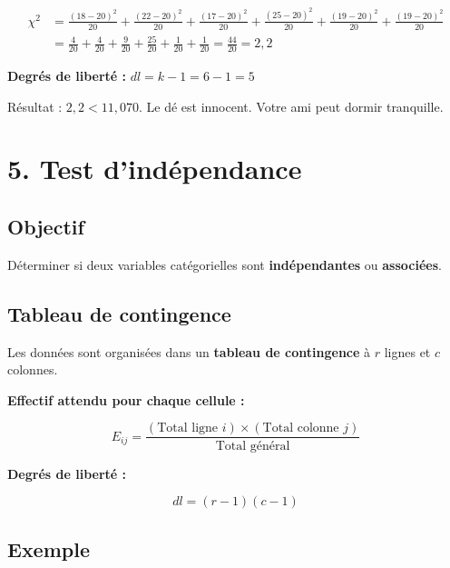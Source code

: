 \documentclass[12pt, a4paper]{article}
\begin{document}
\begin{align*}
  \chi^2 &= \frac{(18-20)^2}{20} + \frac{(22-20)^2}{20} + \frac{(17-20)^2}{20}
            + \frac{(25-20)^2}{20} + \frac{(19-20)^2}{20} + \frac{(19-20)^2}{20} \\
         &= \frac{4}{20} + \frac{4}{20} + \frac{9}{20} + \frac{25}{20}
            + \frac{1}{20} + \frac{1}{20}
          = \frac{44}{20} = 2{,}2
\end{align*}

\textbf{Degrés de liberté :} $dl = k - 1 = 6 - 1 = 5$

\begin{humourbox}
Résultat : $2{,}2 < 11{,}070$. Le dé est innocent. Votre ami peut dormir tranquille.
\end{humourbox}

\section{5. Test d'indépendance}

\subsection{Objectif}

Déterminer si deux variables catégorielles sont \textbf{indépendantes} ou
\textbf{associées}.

\subsection{Tableau de contingence}

Les données sont organisées dans un \textbf{tableau de contingence} à $r$ lignes et
$c$ colonnes.

\textbf{Effectif attendu pour chaque cellule :}

\begin{equation}
  E_{ij} = \frac{(\text{Total ligne } i) \times (\text{Total colonne } j)}
               {\text{Total général}}
\end{equation}

\textbf{Degrés de liberté :}

\begin{equation}
  dl = (r - 1)(c - 1)
\end{equation}

\subsection{Exemple}
\end{document}
